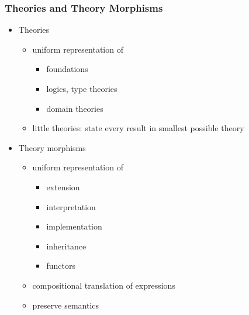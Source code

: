 \documentclass{beamer}
\begin{document}
\begin{frame}\frametitle{Theories and Theory Morphisms}
\begin{itemize}
 \item Theories
   \begin{itemize}
    \item uniform representation of
	   \begin{itemize}
	     \item foundations
	     \item logics, type theories
	     \item domain theories 
	    \end{itemize}
    \item little theories: state every result in smallest possible theory
   \end{itemize}
 \item Theory morphisms
   \begin{itemize}
    \item uniform representation of
	   \begin{itemize}
	     \item extension 
	     \item interpretation 
	     \item implementation 
	     \item inheritance 
	     \item functors 
	    \end{itemize}
    \item compositional translation of expressions
    \item preserve semantics
  \end{itemize}
\end{itemize}
\end{frame}
\end{document}
